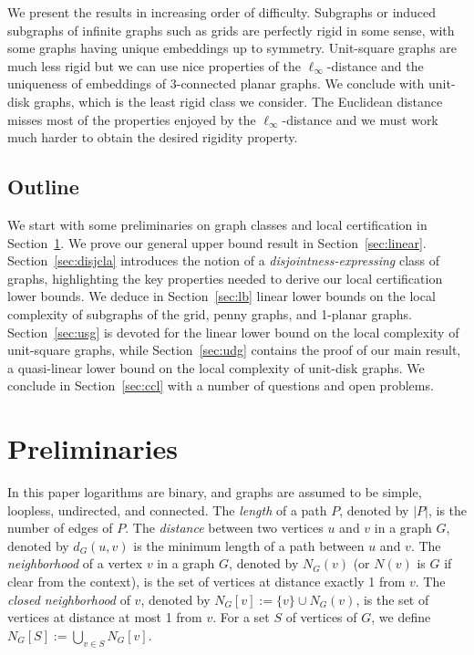 \documentclass[a4paper,reqno, 12pt]{amsart}
\begin{document}
We present the results in increasing order of difficulty. Subgraphs or
induced subgraphs of infinite graphs such as grids are perfectly rigid
in some sense, with some graphs having unique embeddings up to
symmetry. Unit-square graphs are much less rigid but we can use nice
properties of the $\ell_\infty$-distance and the uniqueness of
embeddings of 3-connected planar graphs. We conclude with unit-disk graphs, which is the least
rigid class we consider. The Euclidean distance misses most of the
properties enjoyed by the $\ell_\infty$-distance and we must work much
harder to obtain the desired rigidity property. 

\subsection*{Outline} We start with some preliminaries on graph classes
and local certification in Section~\ref{sec:prel}. We prove our
general upper bound result in
Section~\ref{sec:linear}. 
Section~\ref{sec:disjcla} introduces the
notion of a \emph{disjointness-expressing} class of graphs,
highlighting the key properties needed 
to derive our local certification lower bounds.
We deduce in Section~\ref{sec:lb} linear
lower bounds on the local complexity of subgraphs of the grid, penny
graphs, and 1-planar graphs. Section~\ref{sec:usg} is devoted for the
linear lower bound on the local complexity of unit-square graphs,
while Section~\ref{sec:udg} contains the proof of our main result, a
quasi-linear lower bound on the local complexity of unit-disk
graphs. We conclude in Section~\ref{sec:ccl} with a number of questions
and open problems.


\section{Preliminaries}\label{sec:prel}

In this paper logarithms are binary, and graphs are assumed to be simple, loopless,
undirected, and connected.
The \emph{length} of a path $P$, denoted by $|P|$, is the number of
edges of $P$.
The \emph{distance} between two vertices $u$ and $v$ in a graph $G$,
denoted by $d_G(u,v)$  is the minimum
length of a path between $u$ and $v$. The \emph{neighborhood} of a vertex $v$
in a graph $G$, denoted by $N_G(v)$ (or $N(v)$ is $G$ if clear from the
context),  is the set of vertices at distance exactly 1 from $v$. The
\emph{closed neighborhood} of $v$, denoted by  $N_G[v]:=\{v\}\cup N_G(v)$,
is the set of vertices at distance at most 1 from $v$. For a set $S$
of vertices of $G$, we define $N_G[S]:=\bigcup_{v\in S}N_G[v]$.
\end{document}
